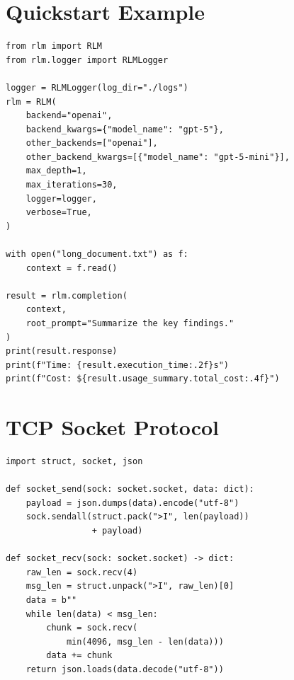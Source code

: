 \documentclass[journal, 10pt, letterpaper]{IEEEtran}
\begin{document}
\appendix

\section{Quickstart Example}
\label{app:quickstart}

\begin{lstlisting}[caption={Basic RLM usage with OpenAI backend.}]
from rlm import RLM
from rlm.logger import RLMLogger

logger = RLMLogger(log_dir="./logs")
rlm = RLM(
    backend="openai",
    backend_kwargs={"model_name": "gpt-5"},
    other_backends=["openai"],
    other_backend_kwargs=[{"model_name": "gpt-5-mini"}],
    max_depth=1,
    max_iterations=30,
    logger=logger,
    verbose=True,
)

with open("long_document.txt") as f:
    context = f.read()

result = rlm.completion(
    context,
    root_prompt="Summarize the key findings."
)
print(result.response)
print(f"Time: {result.execution_time:.2f}s")
print(f"Cost: ${result.usage_summary.total_cost:.4f}")
\end{lstlisting}

\section{TCP Socket Protocol}
\label{app:protocol}

\begin{lstlisting}[caption={Length-prefixed TCP socket protocol from
  \texttt{rlm/core/comms\_utils.py}.}]
import struct, socket, json

def socket_send(sock: socket.socket, data: dict):
    payload = json.dumps(data).encode("utf-8")
    sock.sendall(struct.pack(">I", len(payload))
                 + payload)

def socket_recv(sock: socket.socket) -> dict:
    raw_len = sock.recv(4)
    msg_len = struct.unpack(">I", raw_len)[0]
    data = b""
    while len(data) < msg_len:
        chunk = sock.recv(
            min(4096, msg_len - len(data)))
        data += chunk
    return json.loads(data.decode("utf-8"))
\end{lstlisting}
\end{document}
